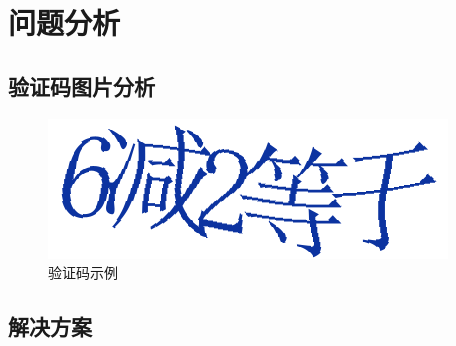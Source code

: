 \chapter{问题分析}
\label{chapter:2}

\section{验证码图片分析}

\begin{figure}
	\centering
	\includegraphics[width=0.7\linewidth]{Resources/Picture/test1_20240102160004_server}
	\caption{验证码示例}
	\label{fig:test120240102160004server}
\end{figure}

\section{解决方案}
